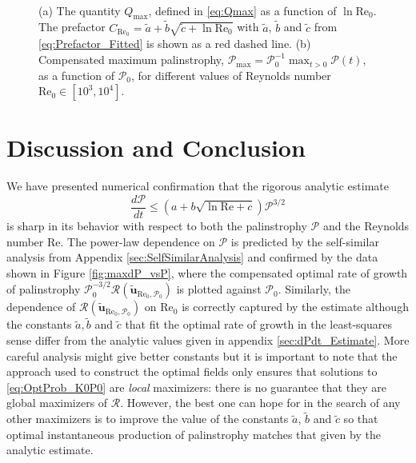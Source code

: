 \documentclass[11pt]{article}
\def\P{{\mathcal{P}}}
\def\R{{\mathcal{R}}}
\newcommand{\Reyn}{\textrm{Re}}
\newcommand{\tuvecRP}{\widetilde{\mathbf{u}}_{\Reyn_0,\P_0}}
\begin{document}
\begin{figure}
\linespread{1.1}
\setcounter{subfigure}{0}
\begin{center}
\\
\caption[Optimal $P(t)$ vs $\P$]{
(a) The quantity $Q_{\max}$, defined in \eqref{eq:Qmax} as a function of $\ln \Reyn_0$. The prefactor $C_{\Reyn_0} = \tilde{a}+\tilde{b}\sqrt{\tilde{c}+\ln\Reyn_0}$ with $\tilde{a}$, $\tilde{b}$ and $\tilde{c}$ from \eqref{eq:Prefactor_Fitted} is shown as a red dashed line. (b) Compensated maximum palinstrophy, $\P_{\max} = \P_0^{-1}\max_{t > 0}\P(t)$, as a function of  $\P_0$, for different values of Reynolds number $\Reyn_0\in[10^3,10^4]$.} 
\label{fig:maxP_FT}
\end{center}
\end{figure}

\section{Discussion and Conclusion}
\label{sec:Conclusion}

We have presented numerical confirmation that the rigorous analytic estimate
\[
\frac{d\P}{dt} \leq \left(a + b\sqrt{\ln \Reyn + c}\right)\P^{3/2}
\]
is sharp in its behavior with respect to both the palinstrophy $\P$ and the Reynolds number $\Reyn$.
The power-law dependence on $\P$ is predicted by the self-similar analysis from Appendix \ref{sec:SelfSimilarAnalysis} and confirmed by the data shown in Figure \ref{fig:maxdP_vsP}, where the compensated optimal rate of growth of palinstrophy $\P_0^{-3/2}\R(\tuvecRP)$ is plotted against $\P_0$.
Similarly, the dependence of $\R(\tuvecRP)$ on $\Reyn_0$ is correctly captured by the estimate although the constants $\tilde{a}, \tilde{b}$ and $\tilde{c}$ that fit the optimal rate of growth in the least-squares sense differ from the analytic values given in appendix \ref{sec:dPdt_Estimate}.
More careful analysis might give better constants but it is important to note that the approach used to construct the optimal fields only ensures that solutions to \eqref{eq:OptProb_K0P0} are {\it local} maximizers: there is no guarantee that they are global maximizers of $\R$.
However, the best one can hope for in the search of any other maximizers is to improve the value of the constants $\tilde{a}$, $\tilde{b}$ and $\tilde{c}$ so that optimal instantaneous production of palinstrophy matches that given by the analytic estimate. 
\end{document}
